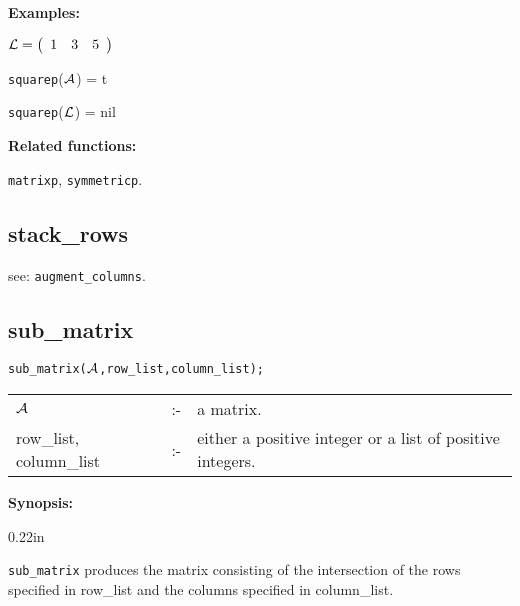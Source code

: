 {\bf Examples:}

\begin{flushleft}
\hspace*{0.175in}
\begin{math}
{\cal L} = \left( \begin{array}{ccc} 1 & 3 & 5
\end{array} \right)
\end{math}
\end{flushleft}

\vspace*{0.1in}

\hspace*{0.175in} {\tt squarep}(${\cal A}$) = t

\hspace*{0.175in} {\tt squarep}(${\cal L}$) = nil

{\bf Related functions:}

\hspace*{0.175in} {\tt matrixp}, {\tt symmetricp}.


\subsection{stack\_rows}

\hspace*{0.175in} see: {\tt augment\_columns}.


\subsection{sub\_matrix}


\hspace*{0.175in} {\tt sub\_matrix(${\cal A}$,row\_list,column\_list);}

\hspace*{0.1in}
\begin{tabular}{l l l}
${\cal A}$              &:-& a matrix. \\
row\_list, column\_list &:-& \parbox[t]{.605\linewidth}{either a
positive integer or a list of positive integers.}
\end{tabular}

{\bf Synopsis:} %


\begin{addtolength}{\leftskip}{0.22in}

{\tt sub\_matrix} produces the matrix consisting of the
              intersection of the rows specified in row\_list and the
columns specified in column\_list.

\end{addtolength}

